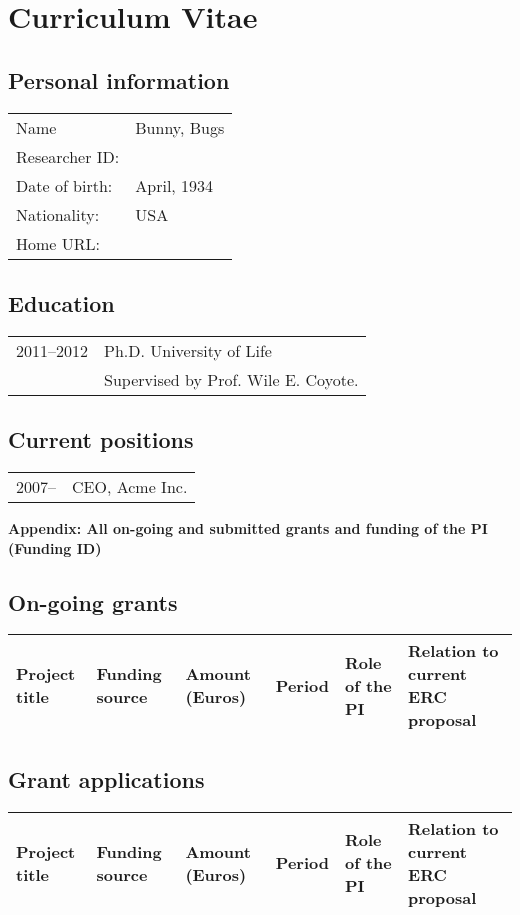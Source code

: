 \section{Curriculum Vitae}


\subsection*{Personal information}
\begin{tabular}{ll}
  Name & Bunny, Bugs \\
  Researcher ID: & \\
  Date of birth: & April, 1934 \\
  Nationality: & USA \\
  Home URL: & \\
\end{tabular}

\subsection*{Education}
\begin{tabular}{p{2cm}p{14cm}}
  2011--2012 & Ph.D.  University of Life \\
             & Supervised by Prof. Wile E. Coyote. \\
\end{tabular}

\subsection*{Current positions}
\begin{tabular}{p{2cm}p{14cm}}
  2007-- & CEO, Acme Inc. \\
\end{tabular}


\newpage
\centerline{\textbf{Appendix: All on-going and submitted grants and funding of
    the PI (Funding ID)}}
\subsection*{On-going grants}
\begin{tabular}{|p{1.8cm}|p{1.5cm}|p{1.8cm}|l|l|p{5cm}|}
  \hline\rowcolor[gray]{0.9}
  \raggedright
  Project title & Funding source & Amount (Euros) & Period
  & Role of the PI & Relation to current ERC proposal \\
  \hline
\end{tabular}

\subsection*{Grant applications}
\begin{tabular}{|p{1.8cm}|p{1.5cm}|p{1.8cm}|l|l|p{5cm}|}
  \hline\rowcolor[gray]{0.9}
  \raggedright
  Project title & Funding source & Amount (Euros) & Period
  & Role of the PI & Relation to current ERC proposal \\
  \hline
\end{tabular}



